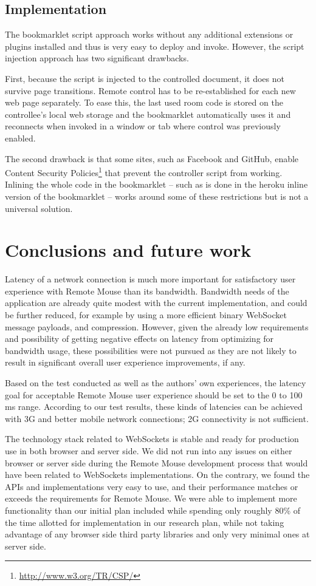 \documentclass[a4paper,english,twocolumn]{article}
\begin{document}
\subsection*{Implementation}

The bookmarklet script approach works without any additional
extensions or plugins installed and thus is very easy to deploy and
invoke. However, the script injection approach has two significant
drawbacks.

First, because the script is injected to the controlled document, it
does not survive page transitions. Remote control has to be
re-established for each new web page separately. To ease this, the
last used room code is stored on the controllee's local web storage
and the bookmarklet automatically uses it and reconnects when invoked
in a window or tab where control was previously enabled.

The second drawback is that some sites, such as Facebook and GitHub,
enable Content Security
Policies\footnote{\url{http://www.w3.org/TR/CSP/}} that prevent the
controller script from working. Inlining the whole code in the
bookmarklet -- such as is done in the heroku inline version of the
bookmarklet -- works around some of these restrictions but is not a
universal solution.

\section{Conclusions and future work}

Latency of a network connection is much more important for
satisfactory user experience with Remote Mouse than its
bandwidth. Bandwidth needs of the application are already quite modest
with the current implementation, and could be further reduced, for
example by using a more efficient binary WebSocket message payloads,
and compression. However, given the already low requirements and
possibility of getting negative effects on latency from optimizing for
bandwidth usage, these possibilities were not pursued as they are not
likely to result in significant overall user experience improvements,
if any.

Based on the test conducted as well as the authors' own experiences,
the latency goal for acceptable Remote Mouse user experience should be
set to the 0 to 100 ms range. According to our test results, these
kinds of latencies can be achieved with 3G and better mobile network
connections; 2G connectivity is not sufficient.

The technology stack related to WebSockets is stable and ready for
production use in both browser and server side. We did not run into
any issues on either browser or server side during the Remote Mouse
development process that would have been related to WebSockets
implementations. On the contrary, we found the APIs and
implementations very easy to use, and their performance matches or
exceeds the requirements for Remote Mouse. We were able to implement
more functionality than our initial plan included while spending only
roughly 80\% of the time allotted for implementation in our research
plan, while not taking advantage of any browser side third party
libraries and only very minimal ones at server side.
\end{document}
